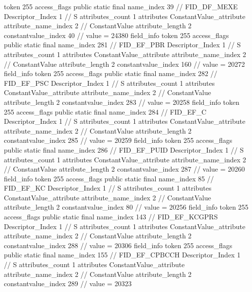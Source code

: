 {{{{{				token	255
				access_flags	public static final
				name_index	39		// FID_DF_MEXE
				Descriptor_Index	1		// S
				attributes_count	1
				attributes {
				ConstantValue_attribute {
					attribute_name_index	2		// ConstantValue
					attribute_length	2
					constantvalue_index	40		// value = 24380
				}
				}
			}
			field_info {
				token	255
				access_flags	public static final
				name_index	281		// FID_EF_PBR
				Descriptor_Index	1		// S
				attributes_count	1
				attributes {
				ConstantValue_attribute {
					attribute_name_index	2		// ConstantValue
					attribute_length	2
					constantvalue_index	160		// value = 20272
				}
				}
			}
			field_info {
				token	255
				access_flags	public static final
				name_index	282		// FID_EF_PSC
				Descriptor_Index	1		// S
				attributes_count	1
				attributes {
				ConstantValue_attribute {
					attribute_name_index	2		// ConstantValue
					attribute_length	2
					constantvalue_index	283		// value = 20258
				}
				}
			}
			field_info {
				token	255
				access_flags	public static final
				name_index	284		// FID_EF_C
				Descriptor_Index	1		// S
				attributes_count	1
				attributes {
				ConstantValue_attribute {
					attribute_name_index	2		// ConstantValue
					attribute_length	2
					constantvalue_index	285		// value = 20259
				}
				}
			}
			field_info {
				token	255
				access_flags	public static final
				name_index	286		// FID_EF_PUID
				Descriptor_Index	1		// S
				attributes_count	1
				attributes {
				ConstantValue_attribute {
					attribute_name_index	2		// ConstantValue
					attribute_length	2
					constantvalue_index	287		// value = 20260
				}
				}
			}
			field_info {
				token	255
				access_flags	public static final
				name_index	85		// FID_EF_KC
				Descriptor_Index	1		// S
				attributes_count	1
				attributes {
				ConstantValue_attribute {
					attribute_name_index	2		// ConstantValue
					attribute_length	2
					constantvalue_index	80		// value = 20256
				}
				}
			}
			field_info {
				token	255
				access_flags	public static final
				name_index	143		// FID_EF_KCGPRS
				Descriptor_Index	1		// S
				attributes_count	1
				attributes {
				ConstantValue_attribute {
					attribute_name_index	2		// ConstantValue
					attribute_length	2
					constantvalue_index	288		// value = 20306
				}
				}
			}
			field_info {
				token	255
				access_flags	public static final
				name_index	155		// FID_EF_CPBCCH
				Descriptor_Index	1		// S
				attributes_count	1
				attributes {
				ConstantValue_attribute {
					attribute_name_index	2		// ConstantValue
					attribute_length	2
					constantvalue_index	289		// value = 20323
}}}}}}}
